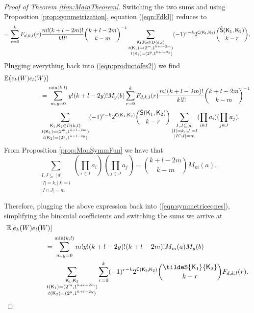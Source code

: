 \documentclass[11pt, a4paper, oneside, reqno]{amsart}
\newcommand{\sK}{{\sf K}}
\theoremstyle{remark}
\theoremstyle{definition}
\numberwithin{equation}{section}
\begin{document}
\begin{proof}[Proof of Theorem \ref{thm:MainTheorem}]
Switching the two sums and using Proposition \ref{prop:symmetrization}, equation (\ref{eqn:Fdkl}) reduces to
\begin{align*}
	= \sum_{r=0}^k F_{d,k,l}(r) \frac{m!(k+l-2m)!}{k!l!}\binom{k+l-2m}{k-m}^{-1}\sum_{\substack{{\sf K_1, \sf K_2} \in D(k,l) \\ {t({\sf K}_1)}=(2^m,1^{k+l-2m}) \\  {t({\sf K}_2)}=(2^y,1^{k+l-2y})}}(-1)^{r-k} 2^{{\sf C}({\sf K_1},{\sf K_2})} \binom{\tilde{\sf S}({\sf K}_1, {\sf K}_2)}{k-r}.
\end{align*}
Plugging everything back into (\ref{eqn:productofes2}) we find
\begin{align}
	 & \mathbb{E}\bigl(e_k(W) e_{l}(W)\bigr) \nonumber                                                                   \\
	 & \hspace{2cm}= \sum_{m,y=0}^{\min(k,l)}  {y!(k+l-2y)!}M_y(b) \sum_{r=0}^k F_{d,k,l}(r) \frac{m!(k+l-2m)!}{k!l!} \binom{k+l-2m}{k-m}^{-1} \nonumber \\
	 & \hspace{2cm} \sum_{\substack{\mathsf{K}_1,\mathsf{K}_2 \in D(k,l)                                                                               \\ t(\mathsf{K}_1)=(2^m,1^{k+l-2m})\\ t(\mathsf{K}_2)=(2^y,1^{k+l-2y})}} (-1)^{r-k}2^{{\sf C}(\mathsf{K}_1,\mathsf{K}_2)} \binom{\tilde{\mathsf{S}}(\mathsf{K}_1, \mathsf{K}_2)}{k-r} \sum_{\substack{I,J \subseteq [d]\\ |I| = k, |J| = l \\ |I \cap J| =m}} (\prod_{i\in I}a_{i})(\prod_{j\in J}a_{j}). \label{eqn:symmetriceqnes}
\end{align}
From Proposition \ref{prop:MonSymmFun} we have that
$$
	\sum_{\substack{I,J \subseteq [d]\\ |I| = k, |J| = l \\ |I \cap J| =m}}  (\prod_{i\in I}a_{i})(\prod_{j\in J}a_{j})= \binom{k+l-2m}{k-m}M_m(a).
$$


Therefore, plugging the above expression back into (\ref{eqn:symmetriceqnes}), simplifying the binomial coefficients and switching the sums we arrive at 
\begin{align*}
	 & \mathbb{E}[e_k(W)e_l(W)]                            \\
	 & \hspace{2cm}= \sum_{m,y=0}^{\text{min}(k,l)}  {m!y!(k+l-2y)!(k+l-2m)!}M_m(a)M_y(b)  \\
	 & \hspace{2cm} \sum_{\substack{\sf K_1, \sf K_2                                     \\ t({\sf K}_1)=(2^m,1^{k+l-2m}) \\ t({\sf K}_2)=(2^y,1^{k+l-2y})}} \sum_{r=0}^k (-1)^{r-k}2^{{\sf C}({\sf K_1},{\sf K}_2)} \binom{\tildeS{\sK_1 }{\sK_2}}{k-r} F_{d,k,l}(r).
\end{align*}


\end{proof}
\end{document}
